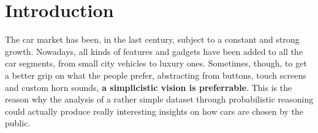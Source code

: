 \section{Introduction}
\label{sec:introduction}

The car market has been, in the last century, subject to a constant and strong growth. Nowadays, all kinds of features and gadgets have been added to all the car segments, from small city vehicles to luxury ones. Sometimes, though, to get a better grip on what the people prefer, abstracting from buttons, touch screens and custom horn sounds, \textbf{a simplicistic vision is preferrable}. This is the reason why the analysis of a rather simple dataset through probabilistic reasoning could actually produce really interesting insights on how cars are chosen by the public.